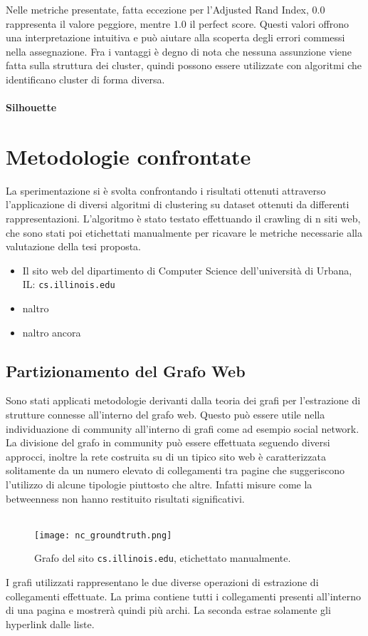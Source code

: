 Nelle metriche presentate, fatta eccezione per l'Adjusted Rand Index, $0.0$ rappresenta il valore peggiore, mentre $1.0$ il perfect score. Questi valori offrono una interpretazione intuitiva e può aiutare alla scoperta degli errori commessi nella assegnazione. Fra i vantaggi è degno di nota che nessuna assunzione viene fatta sulla struttura dei cluster, quindi possono essere utilizzate con algoritmi che identificano cluster di forma diversa.

\paragraph{Silhouette}

\section{Metodologie confrontate}
La sperimentazione si è svolta confrontando i risultati ottenuti attraverso l'applicazione di diversi algoritmi di clustering su dataset ottenuti da differenti rappresentazioni. L'algoritmo è stato testato effettuando il crawling di n siti web, che sono stati poi etichettati manualmente per ricavare le metriche necessarie alla valutazione della tesi proposta.
\begin{itemize}
\item Il sito web del dipartimento di Computer Science dell'università di Urbana, IL: \texttt{cs.illinois.edu}
\item naltro
\item naltro ancora
\end{itemize}
\subsection{Partizionamento del Grafo Web}
Sono stati applicati metodologie derivanti dalla teoria dei grafi per l'estrazione di strutture connesse all'interno del grafo web. Questo può essere utile nella individuazione di community all'interno di grafi come ad esempio social network. La divisione del grafo in community può essere effettuata seguendo diversi approcci, inoltre la rete costruita su di un tipico sito web è caratterizzata solitamente da un numero elevato di collegamenti tra pagine che suggeriscono l'utilizzo di alcune tipologie piuttosto che altre. Infatti misure come la betweenness non hanno restituito risultati significativi.
\\\\
\begin{figure}[h!]
	\centering
	\texttt{[image: nc\_groundtruth.png]}
	\caption{Grafo del sito \texttt{cs.illinois.edu}, etichettato manualmente.}
	\label{nc_graph}
\end{figure}
I grafi utilizzati rappresentano le due diverse operazioni di estrazione di collegamenti effettuate. La prima contiene tutti i collegamenti presenti all'interno di una pagina e mostrerà quindi più archi. La seconda estrae solamente gli hyperlink dalle liste.

